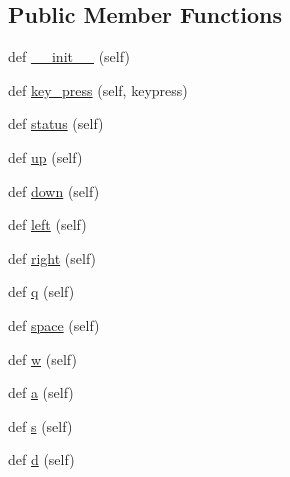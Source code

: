 \subsection*{Public Member Functions}
\begin{DoxyCompactItemize}
\item 
def \hyperlink{classbridges_1_1input__helper_1_1_input_helper_a1e5078f3c252de554409d3fdb49fcaaa}{\+\_\+\+\_\+init\+\_\+\+\_\+} (self)
\item 
def \hyperlink{classbridges_1_1input__helper_1_1_input_helper_ac1501918e03c17ae99e8d04d7576c58e}{key\+\_\+press} (self, keypress)
\item 
def \hyperlink{classbridges_1_1input__helper_1_1_input_helper_a49594a94ff16c661fc275191ff9217c9}{status} (self)
\item 
def \hyperlink{classbridges_1_1input__helper_1_1_input_helper_a26a435f11a7c2c202129ad9d86a36283}{up} (self)
\item 
def \hyperlink{classbridges_1_1input__helper_1_1_input_helper_a609f52d4b50d69a7b75c2bf125262413}{down} (self)
\item 
def \hyperlink{classbridges_1_1input__helper_1_1_input_helper_aea173110055fcc3470ac4b61c1608194}{left} (self)
\item 
def \hyperlink{classbridges_1_1input__helper_1_1_input_helper_a87226e5ae46e8c79dfcf87f7493b835a}{right} (self)
\item 
def \hyperlink{classbridges_1_1input__helper_1_1_input_helper_a85de78fab5f34c3969af7c1bc0c1e97b}{q} (self)
\item 
def \hyperlink{classbridges_1_1input__helper_1_1_input_helper_a765e389cd5becacf3880debf4678715b}{space} (self)
\item 
def \hyperlink{classbridges_1_1input__helper_1_1_input_helper_a7f8ea223e81a31d094ea16cc7d4ce1e3}{w} (self)
\item 
def \hyperlink{classbridges_1_1input__helper_1_1_input_helper_ab46a28fb36f78208840e1bc49f523d71}{a} (self)
\item 
def \hyperlink{classbridges_1_1input__helper_1_1_input_helper_a2b08296f9bfe269c481bca1e7a030a53}{s} (self)
\item 
def \hyperlink{classbridges_1_1input__helper_1_1_input_helper_a1eade5f8acf2f1c85671c90cdfcaf57e}{d} (self)
\end{DoxyCompactItemize}
